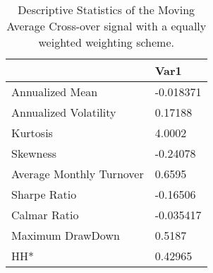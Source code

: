 \begin{table}[H]
\centering
\begin{tabular}{ll}
& Var1 \\ 
\hline 
Annualized Mean & -0.018371 \\ 
Annualized Volatility & 0.17188 \\ 
Kurtosis & 4.0002 \\ 
Skewness & -0.24078 \\ 
Average Monthly Turnover & 0.6595 \\ 
Sharpe Ratio & -0.16506 \\ 
Calmar Ratio & -0.035417 \\ 
Maximum DrawDown & 0.5187 \\ 
HH* & 0.42965 \\ 
\hline
\end{tabular}
\caption{Descriptive Statistics of the Moving Average Cross-over signal with a equally weighted weighting scheme.}
\label{MAEW}
\end{table}